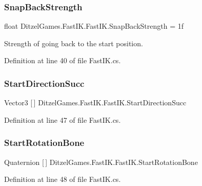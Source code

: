 \subsubsection{\texorpdfstring{SnapBackStrength}{SnapBackStrength}}
{\footnotesize\ttfamily float Ditzel\+Games.\+Fast\+I\+K.\+Fast\+I\+K.\+Snap\+Back\+Strength = 1f}



Strength of going back to the start position. 



Definition at line 40 of file Fast\+I\+K.\+cs.

\mbox{\label{class_ditzel_games_1_1_fast_i_k_1_1_fast_i_k_aa771c38a09f4d5dd662fd4e21d6c8b1a}} 
\subsubsection{\texorpdfstring{StartDirectionSucc}{StartDirectionSucc}}
{\footnotesize\ttfamily Vector3 \mbox{[}$\,$\mbox{]} Ditzel\+Games.\+Fast\+I\+K.\+Fast\+I\+K.\+Start\+Direction\+Succ\hspace{0.3cm}{\ttfamily [protected]}}



Definition at line 47 of file Fast\+I\+K.\+cs.

\mbox{\label{class_ditzel_games_1_1_fast_i_k_1_1_fast_i_k_a7d7a97dbc072ae01257ea829448f3804}} 
\subsubsection{\texorpdfstring{StartRotationBone}{StartRotationBone}}
{\footnotesize\ttfamily Quaternion \mbox{[}$\,$\mbox{]} Ditzel\+Games.\+Fast\+I\+K.\+Fast\+I\+K.\+Start\+Rotation\+Bone\hspace{0.3cm}{\ttfamily [protected]}}



Definition at line 48 of file Fast\+I\+K.\+cs.

